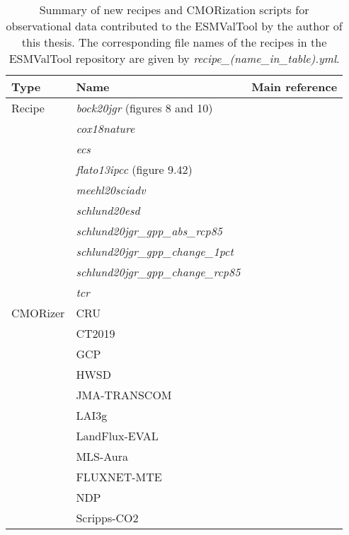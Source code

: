 \begin{table}[t]
  \centering
  \begin{tabulary}{\columnwidth}{L L L}
    \toprule
    Type & Name & Main reference \\
    \midrule
    Recipe & \emph{bock20jgr} (figures 8 and 10) & \autocite{Bock2020} \\
    & \emph{cox18nature} & \autocite{Cox2018} \\
    & \emph{ecs} & \autocite{Gregory2004} \\
    & \emph{flato13ipcc} (figure 9.42) & \autocite{Flato2013} \\
    & \emph{meehl20sciadv} & \autocite{Meehl2020} \\
    & \emph{schlund20esd} & \autocite{Schlund2020a} \\
    & \emph{schlund20jgr\_gpp\_abs\_rcp85} & \autocite{Schlund2020} \\
    & \emph{schlund20jgr\_gpp\_change\_1pct} & \autocite{Schlund2020} \\
    & \emph{schlund20jgr\_gpp\_change\_rcp85} & \autocite{Schlund2020} \\
    & \emph{tcr} & \autocite{Gregory2008} \\
    \midrule
    \ac{CMOR}izer & CRU & \autocite{Harris2014} \\
    & CT2019 & \autocite{Jacobson2020} \\
    & GCP & \autocite{Friedlingstein2020} \\
    & HWSD & \autocite{Wieder2014} \\
    & JMA-TRANSCOM & \autocite{Maki2010} \\
    & LAI3g & \autocite{Zhu2013} \\
    & LandFlux-EVAL & \autocite{Mueller2013} \\
    & MLS-Aura & \autocite{Read2015} \\
    & FLUXNET-MTE & \autocite{Jung2011} \\
    & NDP & \autocite{Gibbs2006} \\
    & Scripps-\ac{CO2} & \autocite{Keeling2005} \\
    \bottomrule
  \end{tabulary}
  \caption[
    Summary of new recipes and \acs{CMOR}ization scripts for observational data
    contributed to the \acf{ESMValTool} by the author of this thesis.
  ]{
    Summary of new recipes and \acs{CMOR}ization scripts for observational data
    contributed to the \acf{ESMValTool} by the author of this thesis. The
    corresponding file names of the recipes in the \acs{ESMValTool} repository
    are given by \emph{recipe\_(name\_in\_table).yml}.
  }
  \label{tab:03:changes_to_esmvaltool}
\end{table}

